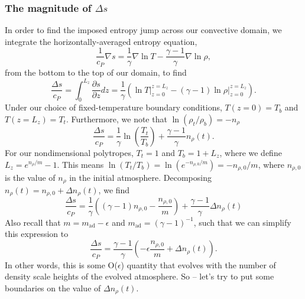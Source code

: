 \documentclass[aps, pre, onecolumn, nofootinbib, notitlepage, groupedaddress, amsfonts, amssymb, amsmath, longbibliography, superscriptaddress]{revtex4-1}
\newcommand{\grad}{\ensuremath{\nabla}}
\begin{document}
\subsubsection{The magnitude of $\Delta s$}
In order to find the imposed entropy jump across our convective domain, we integrate the horizontally-averaged entropy equation,
\begin{equation}
\frac{1}{c_P}\grad s = \frac{1}{\gamma}\grad\ln T - \frac{\gamma - 1}{\gamma}\grad \ln \rho,
\end{equation}
from the bottom to the top of our domain, to find 
$$
\frac{\Delta s}{c_P} = \int_0^{L_z} \frac{\partial s}{\partial z} dz = \frac{1}{\gamma}\left(\ln T\bigg|_{z=0}^{z=L_z} - (\gamma-1)\ln\rho\bigg|_{z=0}^{z=L_z}\right).
$$
Under our choice of fixed-temperature boundary conditions, $T(z=0) = T_b$ and $T(z=L_z) = T_t$.
Furthermore, we note that $\ln(\rho_t/\rho_b) = -n_\rho$
\begin{equation}
\frac{\Delta s}{c_P} = \frac{1}{\gamma}\ln\left(\frac{T_t}{T_b}\right) + \frac{\gamma-1}{\gamma} n_\rho(t).
\end{equation}
For our nondimensional polytropes, $T_t = 1$ and $T_b = 1 + L_z$, where we define $L_z = e^{n_\rho/m} - 1$.
This means $\ln (T_t/T_b) = \ln (e^{-n_{\rho,0}/m}) = -n_{\rho,0}/m$, where $n_{\rho,0}$ is the value of $n_\rho$ in the initial atmosphere.
Decomposing $n_\rho(t) = n_{\rho,0} + \Delta n_\rho(t)$, we find
\begin{equation}
\frac{\Delta s}{c_P} = \frac{1}{\gamma}\left((\gamma-1)n_{\rho,0} - \frac{n_{\rho,0}}{m}\right) + \frac{\gamma-1}{\gamma}\Delta n_\rho(t)
\end{equation}
Also recall that $m = m_{\text{ad}} - \epsilon$ and $m_{\text{ad}} = (\gamma-1)^{-1}$, such that we can simplify this expression to 
\begin{equation}
\frac{\Delta s}{c_P} = \frac{\gamma-1}{\gamma}\left( -\epsilon \frac{n_{\rho,0}}{m} + \Delta n_\rho(t)\right).
\label{eqn:deltaS_evolved}
\end{equation}
In other words, this is some O($\epsilon$) quantity that evolves with the number of density scale heights of the evolved atmosphere.
So -- let's try to put some boundaries on the value of $\Delta n_\rho(t)$.
\end{document}
